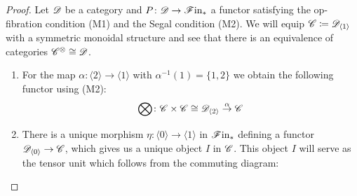  \begin{proof}
    Let $\mathscr{D}$ be a category and $P \colon \mathscr{D} \to \mathscr{F} \text{in}_{\ast}$ a functor satisfying the
    op-fibration condition (M1) and the Segal condition (M2). We will equip $\mathscr{C}
    \coloneqq \mathscr{D}_{\langle 1 \rangle}$ with a symmetric monoidal structure and
    see that there is an equivalence of categories $\mathscr{C}^{\otimes} \cong \mathscr{D}$.
    \begin{enumerate}
    \item For the map $\alpha \colon \langle 2 \rangle \to \langle 1 \rangle$
    with $\alpha^{-1}(1) = \{1,2\}$ we obtain the following functor using (M2):
        \[
            \bigotimes \colon \mathscr{C} \times \mathscr{C} \cong \mathscr{D}_{\langle 2 \rangle} \overset{\alpha}\rightarrow \mathscr{C}
        \]
        
    \item There is a unique morphism $\eta \colon \langle 0 \rangle \to \langle
    1 \rangle$ in $\mathscr{F} \text{in}_{\ast}$ defining a functor $\mathscr{D}_{\langle 0 \rangle} \to \mathscr{C}$,
    which gives us a unique object $I$ in $\mathscr{C}$. This object $I$ will serve as
    the tensor unit which follows from the commuting diagram:
    \begin{center}
     \end{center}


\end{enumerate}
\end{proof}

